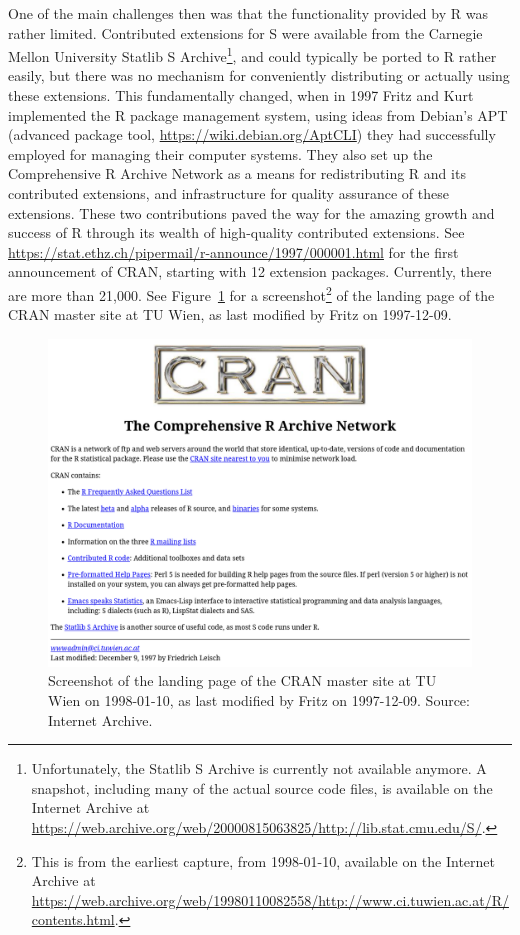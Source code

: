 One of the main challenges then was that the functionality provided by R
was rather limited. Contributed extensions for S were available from the
Carnegie Mellon University Statlib S Archive\footnote{Unfortunately, the Statlib
  S Archive is currently not available anymore. A snapshot, including many
  of the actual source code files, is available on the Internet Archive at
  \url{https://web.archive.org/web/20000815063825/http://lib.stat.cmu.edu/S/}.}, and could typically be
ported to R rather easily, but there was no mechanism for conveniently
distributing or actually using these extensions. This fundamentally
changed, when in 1997 Fritz and Kurt implemented the R package
management system, using ideas from Debian's APT (advanced package tool,
\url{https://wiki.debian.org/AptCLI}) they had successfully employed for
managing their computer systems. They also set up the Comprehensive R
Archive Network \citep[CRAN, \url{https://CRAN.R-project.org/}, see also][]{Hornik:2012} as a means for redistributing R and its contributed
extensions, and infrastructure for quality assurance of these
extensions. These two contributions paved the way for the amazing
growth and success of R through its wealth of high-quality contributed
extensions.
See \url{https://stat.ethz.ch/pipermail/r-announce/1997/000001.html} for
the first announcement of CRAN, starting with 12 extension packages.
Currently, there are more than 21,000. See Figure~\ref{fig:cran}
for a screenshot\footnote{This is from the earliest capture, from 1998-01-10,
  available on the Internet Archive at
  \url{https://web.archive.org/web/19980110082558/http://www.ci.tuwien.ac.at/R/contents.html}.}
of the landing page of the CRAN master site at TU Wien, as last modified
by Fritz on 1997-12-09.

\begin{figure}[t!]

{\centering \includegraphics[width=1\linewidth]{figures/img-cran} 

}

\caption{Screenshot of the landing page of the CRAN master site at TU Wien on 1998-01-10, as last modified by Fritz on 1997-12-09. Source: Internet Archive.}\label{fig:cran}
\end{figure}

